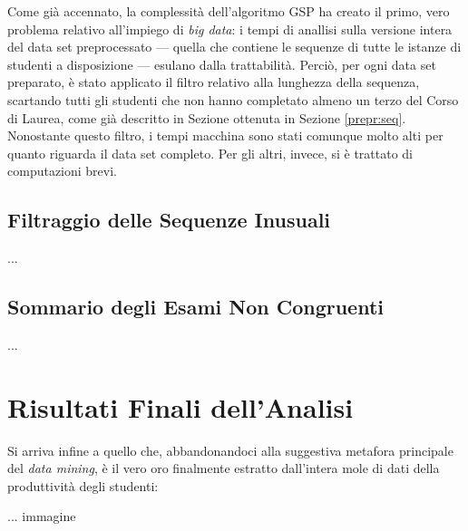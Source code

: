         Come già accennato, la complessità dell'algoritmo GSP ha creato il primo, vero problema relativo all'impiego di \textit{big data}: i tempi di anallisi sulla versione intera del data set preprocessato --- quella che contiene le sequenze di tutte le istanze di studenti a disposizione --- esulano dalla trattabilità. Perciò, per ogni data set preparato, è stato applicato il filtro relativo alla lunghezza della sequenza, scartando tutti gli studenti che non hanno completato almeno un terzo del Corso di Laurea, come già descritto in Sezione ottenuta in Sezione \ref{prepr:seq}. Nonostante questo filtro, i tempi macchina sono stati comunque molto alti per quanto riguarda il data set completo. Per gli altri, invece, si è trattato di computazioni brevi. \\

    \subsection{Filtraggio delle Sequenze Inusuali}

    ...

    \subsection{Sommario degli Esami Non Congruenti}

    ...

\section{Risultati Finali dell'Analisi}

    Si arriva infine a quello che, abbandonandoci alla suggestiva metafora principale del \textit{data mining}, è il vero oro finalmente estratto dall'intera mole di dati della produttività degli studenti:

    ... immagine